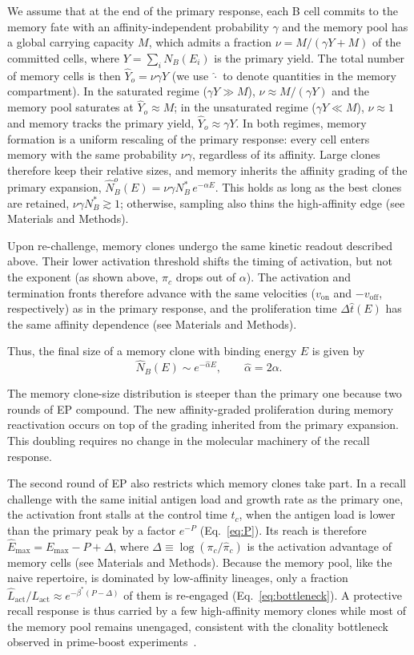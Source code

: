 \documentclass[aps, pre, twocolumn, 10pt, groupedaddress, superscriptaddress, linenumbers]{revtex4-2}
\newcommand{\EQ}{\begin{equation}}
\newcommand{\EE}{\end{equation}}
\newcommand{\on}{\text{on}}
\newcommand{\off}{\text{off}}
\newcommand{\act}{\text{act}}
\newcommand{\DG}{E}
\begin{document}
We assume that at the end of the primary response, each B cell commits to the memory fate with an affinity-independent probability $\gamma$ and the memory pool has a global carrying capacity $M$, which admits a fraction $\nu = M/(\gamma Y + M)$ of the committed cells, where $Y = \sum_i N_B(\DG_i)$ is the primary yield.
The total number of memory cells is then $\hat Y_o = \nu\gamma Y$ (we use $\hat\cdot$ to denote quantities in the memory compartment).
In the saturated regime ($\gamma Y \gg M$), $\nu \approx M/(\gamma Y)$ and the memory pool saturates at $\hat Y_o \approx M$; in the unsaturated regime ($\gamma Y \ll M$), $\nu \approx 1$ and memory tracks the primary yield, $\hat Y_o \approx \gamma Y$.
In both regimes, memory formation is a uniform rescaling of the primary response: every cell enters memory with the same probability $\nu\gamma$, regardless of its affinity.
Large clones therefore keep their relative sizes, and memory inherits the affinity grading of the primary expansion, $\hat N_B^o(\DG) = \nu\gamma N_B^*\, e^{-\alpha\DG}$.
This holds as long as the best clones are retained, $\nu\gamma N_B^* \gtrsim 1$; otherwise, sampling also thins the high-affinity edge (see Materials and Methods).

Upon re-challenge, memory clones undergo the same kinetic readout described above.
Their lower activation threshold shifts the timing of activation, but not the exponent (as shown above, $\pi_c$ drops out of $\alpha$).
The activation and termination fronts therefore advance with the same velocities ($v_\on$ and $-v_\off$, respectively) as in the primary response, and the proliferation time $\Delta\hat t(\DG)$ has the same affinity dependence (see Materials and Methods).

Thus, the final size of a memory clone with binding energy $\DG$ is given by
\EQ
\hat N_B(\DG) \sim e^{-\hat\alpha\DG},
\qquad
\hat\alpha = 2\alpha .
\label{eq:alpha2}
\EE

The memory clone-size distribution is steeper than the primary one because two rounds of EP compound. 
The new affinity-graded proliferation during memory reactivation occurs on top of the grading inherited from the primary expansion.
This doubling requires no change in the molecular machinery of the recall response.

The second round of EP also restricts which memory clones take part.
In a recall challenge with the same initial antigen load and growth rate as the primary one, the activation front stalls at the control time $t_c$, when the antigen load is lower than the primary peak by a factor $e^{-P}$ (Eq.~\ref{eq:P}).
Its reach is therefore $\hat\DG_{\max} = \DG_{\max} - P + \Delta$, where $\Delta \equiv \log(\pi_c/\hat\pi_c)$ is the activation advantage of memory cells (see Materials and Methods).
Because the memory pool, like the naive repertoire, is dominated by low-affinity lineages, only a fraction $\hat L_\act/L_\act \approx e^{-\beta^*(P - \Delta)}$ of them is re-engaged (Eq.~\ref{eq:bottleneck}).
A protective recall response is thus carried by a few high-affinity memory clones while most of the memory pool remains unengaged, consistent with the clonality bottleneck observed in prime-boost experiments~\cite{Mesin_2020_Restricted_clonality}.
\end{document}
